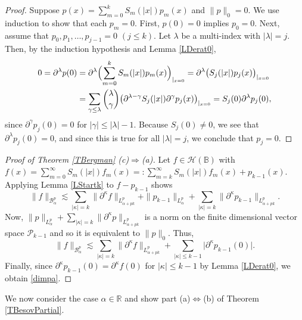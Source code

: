\documentclass{amsart}
\theoremstyle{definition}
\theoremstyle{remark}
\begin{document}
\begin{proof}
Suppose $p(x)=\sum_{m=0}^k S_m(\vert x\vert)p_m(x)$ and $\|p\|_0=0$.
We use induction to show that each $p_m=0$.
First, $p(0)=0$ implies $p_0=0$.
Next, assume that $p_0,p_1,\dots,p_{j-1}=0$ $(j\le k)$.
Let $\lambda$ be a multi-index with $\vert\lambda\vert=j$.
Then, by the induction hypothesis and Lemma \ref{LDerat0},
\begin{align*}
0=\partial^\lambda p(0)
&=\partial^\lambda\Bigl(\sum_{m=0}^k S_m(\vert x\vert)p_m(x)\Bigr)_{\vert_{x=0}}
=\partial^\lambda\bigl(S_j(\vert x\vert)p_j(x)\bigr)_{\vert_{x=0}}\\
&=\sum_{\gamma\le\lambda}\binom{\lambda}{\gamma}
\bigl(\partial^{\lambda-\gamma}S_j(\vert x\vert)\partial^\gamma p_j(x)\bigr)_{\vert_{x=0}}
=S_j(0)\partial^\lambda p_j(0),
\end{align*}
since $\partial^\gamma p_j(0)=0$ for $\vert\gamma\vert\le\vert\lambda\vert-1$.
Because $S_j(0)\neq 0$, we see that $\partial^\lambda p_j(0)=0$, and since this
is true for all $\vert\lambda\vert=j$, we conclude that $p_j=0$.
\end{proof}

\begin{proof}[Proof of Theorem \ref{TBergman} (c)$\Rightarrow$(a)]
Let $f\in\mathcal H(\mathbb B)$ with
$f(x)=\sum_{m=0}^\infty S_m(\vert x\vert)f_m(x)
=:\sum_{m=k}^\infty S_m(\vert x\vert)f_m(x)+p_{k-1}(x)$.
Applying Lemma \ref{LStartk} to $f-p_{k-1}$ shows
\begin{equation*}
\|f\|_{\mathcal B^p_\alpha}
\lesssim \sum_{\vert\kappa\vert=k} \|\partial^\kappa f\|_{L^p_{\alpha+pk}}
+\|p_{k-1}\|_{L^p_\alpha}
+\sum_{\vert\kappa\vert=k} \|\partial^\kappa p_{k-1}\|_{L^p_{\alpha+pk}}.
\end{equation*}
Now, $\|p\|_{L^p_\alpha}
+\sum_{\vert\kappa\vert=k} \|\partial^\kappa p\|_{L^p_{\alpha+pk}}$
is a norm on the finite dimensional vector space $\mathcal P_{k-1}$ and so
it is equivalent to $\|p\|_0$.
Thus,
\begin{equation*}
\|f\|_{\mathcal B^p_\alpha}
\lesssim \sum_{\vert\kappa\vert=k} \|\partial^\kappa f\|_{L^p_{\alpha+pk}}
+\sum_{\vert\kappa\vert\le k-1}\vert\partial^\kappa p_{k-1}(0)\vert.
\end{equation*}
Finally, since $\partial^\kappa p_{k-1}(0)=\partial^\kappa f(0)$
for $\vert\kappa\vert\le k-1$ by Lemma \ref{LDerat0}, we obtain \eqref{dimpa}.
\end{proof}

We now consider the case $\alpha\in\mathbb R$ and show part (a)$\Leftrightarrow$(b)
of Theorem \ref{TBesovPartial}.
\end{document}
